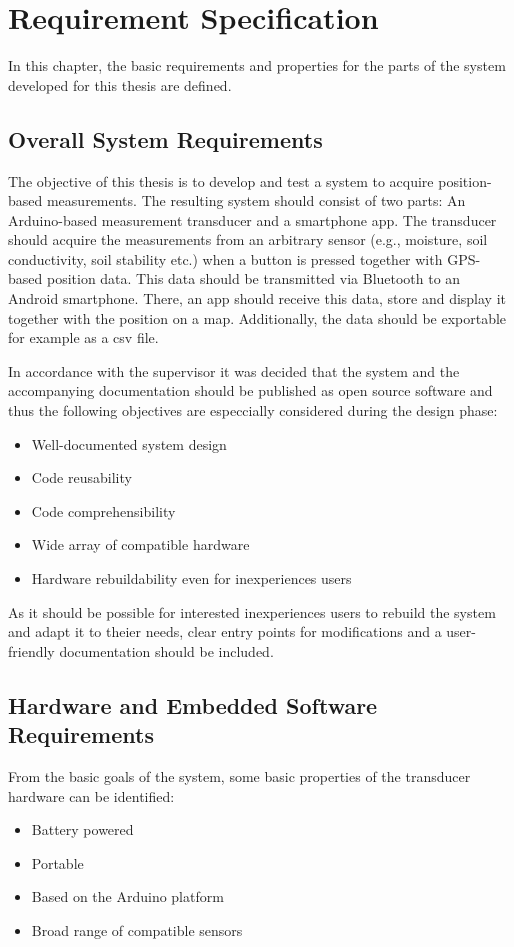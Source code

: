 \chapter{Requirement Specification}
\label{cha:requirements}
In this chapter, the basic requirements and properties for the parts of the system developed for this thesis are defined.

\section{Overall System Requirements}
The objective of this thesis is to develop and test a system to acquire position-based measurements. The resulting system should consist of two parts: An Arduino-based measurement transducer and a smartphone app.
The transducer should acquire the measurements from an arbitrary sensor (e.g., moisture, soil conductivity, soil stability etc.) when a button is pressed together with GPS-based position data. This data should be transmitted via Bluetooth to an Android smartphone. There, an app should receive this data, store and display it together with the position on a map. Additionally, the data should be exportable for example as a csv file.

In accordance with the supervisor it was decided that the system and the accompanying documentation should be published as open source software and thus the following objectives are especcially considered during the design phase:
\begin{itemize}
	\item Well-documented system design
	\item Code reusability
	\item Code comprehensibility
	\item Wide array of compatible hardware
	\item Hardware rebuildability even for inexperiences users
\end{itemize}

As it should be possible for interested inexperiences users to rebuild the system and adapt it to theier needs, clear entry points for modifications and a user-friendly documentation should be included.

\section{Hardware and Embedded Software Requirements}
From the basic goals of the system, some basic properties of the transducer hardware can be identified:
\begin{itemize}
	\item Battery powered
	\item Portable
	\item Based on the Arduino platform
	\item Broad range of compatible sensors
\end{itemize}

